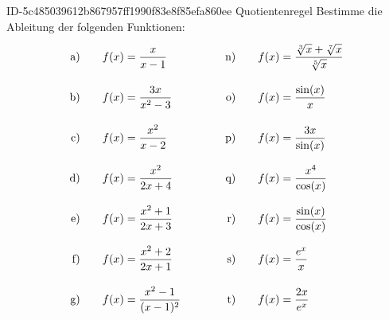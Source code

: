 \begin{exercise}
      {ID-5c485039612b867957ff1990f83e8f85efa860ee}
      {Quotientenregel}
  \ifproblem\problem
    Bestimme die Ableitung der folgenden Funktionen:
    \begingroup
      \newcommand{\vstrut}{\rule[-3.5ex]{0pt}{7.5ex}}%
      \newcommand{\xca}{f(x)&=\frac{x}{x-1}}%
      \newcommand{\xcb}{f(x)&=\frac{3x}{x^{2}-3}}%
      \newcommand{\xcc}{f(x)&=\frac{x^{2}}{x-2}}%
      \newcommand{\xcd}{f(x)&=\frac{x^{2}}{2x+4}}%
      \newcommand{\xce}{f(x)&=\frac{x^{2}+1}{2x+3}}%
      \newcommand{\xcf}{f(x)&=\frac{x^{2}+2}{2x+1}}%
      \newcommand{\xcg}{f(x)&=\frac{x^{2}-1}{(x-1)^{2}}}%
      \newcommand{\xch}{f(x)&=\frac{2x+1}{2x-1}}%
      \newcommand{\xci}{f(x)&=\frac{x-t}{x^{2}+t}}%
      \newcommand{\xcj}{f(x)&=\frac{x^{2}+2x-1}{x-1}}%
      \newcommand{\xck}{f(x)&=\frac{x^{2}}{-x^{3}+6x-4}}%
      \newcommand{\xcl}{f(x)&=\frac{5x-3}{3x^{2}}}%
      \newcommand{\xcm}{f(x)&=\frac{4a}{x}}%
      \newcommand{\xcn}{f(x)&=\frac{\sqrt[3]{x}+\sqrt[7]{x}}{\sqrt[5]{x}}}%
      \newcommand{\xco}{f(x)&=\frac{\sin(x)}{x}}%
      \newcommand{\xcp}{f(x)&=\frac{3x}{\sin(x)}}%
      \newcommand{\xcq}{f(x)&=\frac{x^{4}}{\cos(x)}}%
      \newcommand{\xcr}{f(x)&=\frac{\sin(x)}{\cos(x)}}%
      \newcommand{\xcs}{f(x)&=\frac{e^{x}}{x}}%
      \newcommand{\xct}{f(x)&=\frac{2x}{e^{x}}}%
      \newcommand{\xcu}{f(x)&=\frac{e^{x}-x}{\sqrt{x}}}%
      \newcommand{\xcv}{f(x)&=\frac{x^{2}+1}{e^{x}}}%
      \newcommand{\xcw}{f(x)&=\frac{x}{\ln(x)}}%
      \newcommand{\xcx}{f(x)&=\frac{3\log_{3}(x)}{x^{3}}}%
      \newcommand{\xcy}{f(x)&=\frac{x^{2}-\ln(x)}{\ln(x)-x^{2}}}%
      \newcommand{\xcz}{f(x)&=\log_{x^{n}}(a)}%
      \allowdisplaybreaks
      \begin{alignat*}{5}
        \text{a)\vstrut}&\quad & \xca & \quad&\quad & \text{n)\vstrut}&\quad & \xcn \\
        \text{b)\vstrut}&\quad & \xcb & \quad&\quad & \text{o)\vstrut}&\quad & \xco \\
        \text{c)\vstrut}&\quad & \xcc & \quad&\quad & \text{p)\vstrut}&\quad & \xcp \\
        \text{d)\vstrut}&\quad & \xcd & \quad&\quad & \text{q)\vstrut}&\quad & \xcq \\
        \text{e)\vstrut}&\quad & \xce & \quad&\quad & \text{r)\vstrut}&\quad & \xcr \\
        \text{f)\vstrut}&\quad & \xcf & \quad&\quad & \text{s)\vstrut}&\quad & \xcs \\
        \text{g)\vstrut}&\quad & \xcg & \quad&\quad & \text{t)\vstrut}&\quad & \xct \\

\end{alignat*}
\end{exercise}
